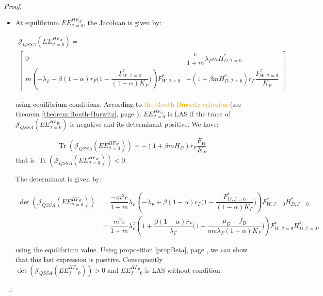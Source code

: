 \documentclass{article}
\newcommand{\lfw}{\lambda_{F}}
\newcommand{\lfw}{\lambda_{F}}
\newcommand{\cI}{\mathcal{I}}
\newcommand{\vdeux}[1]{\textcolor{orange}{#1}}
\DeclareMathOperator{\Tr}{Tr}
\theoremstyle{definition}
\theoremstyle{remark}
\begin{document}
\begin{proof}
\begin{itemize}
\item At equilibrium $EE^{HF_W}_{\cI = 0}$, the Jacobian is given by:

\begin{multline*}
\mathcal{J}_{QSSA}(EE^{HF_W}_{\cI = 0}) = \\
\begin{bmatrix}
0 & \dfrac{e}{1+m} \lfw m H^*_{D, \cI = 0} \\
m\left(-\lfw + \beta (1-\alpha) r_F \Big(1- \dfrac{F^*_{W, \cI = 0}}{(1-\alpha)K_F} \Big) \right) F^*_{W, \cI = 0} & -(1+\beta m H^*_{D, \cI = 0}) r_F \dfrac{F^*_{W, \cI = 0}}{K_F} 
\end{bmatrix}
\end{multline*}

using equilibrium conditions. According to \vdeux{the Routh-Hurwitz criterion} (see theorem \ref{theorem:Routh-Hurwitz}, page \pageref{theorem:Routh-Hurwitz} ),  $EE^{HF_W}_{\cI = 0}$ is LAS if the trace of $\mathcal{J}_{QSSA}(EE^{HF_W}_{\cI = 0}) $ is negative and its determinant positive. We have:

\begin{equation*}
\Tr(\mathcal{J}_{QSSA}(EE^{HF_W}_{\cI = 0})) = -(1+\beta m H_D) r_F \dfrac{F_W}{K_F}
\end{equation*}
that is $\Tr(\mathcal{J}_{QSSA}(EE^{HF_W}_{\cI = 0})) < 0$.

The determinant is given by:

\begin{align*}
\det(\mathcal{J}_{QSSA}(EE^{HF_W}_{\cI = 0})) &=  \dfrac{- m^2 e}{1+m} \lfw \left(-\lfw + \beta (1-\alpha) r_F \Big(1- \dfrac{F^*_{W, \cI = 0}}{(1-\alpha)K_F} \Big) \right) F^*_{W, \cI = 0} H^*_{D, \cI = 0}, \\
&= \dfrac{m^2 e}{1+m} \lfw^2 \left(1 + \dfrac{\beta (1-\alpha) r_F}{\lfw} \Big(1- \dfrac{\mu_D - f_D}{me \lfw(1-\alpha)K_F} \Big) \right) F^*_{W, \cI = 0} H^*_{D, \cI = 0},
\end{align*}

using the equilibrium value. Using proposition \ref{propBeta}, page \pageref{propBeta}, we can show that this last expression is positive. Consequently $\det(\mathcal{J}_{QSSA}(EE^{HF_W}_{\cI = 0})) > 0$ and $EE^{HF_W}_{\cI = 0}$ is LAS without condition.
\end{itemize}
\end{proof}
\end{document}
